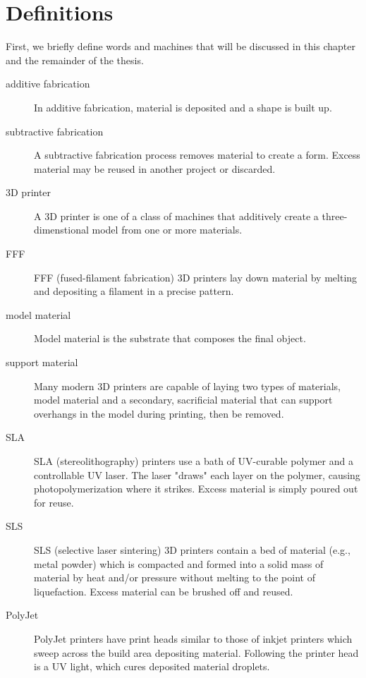 \section{Definitions}

First, we briefly define words and machines that will be discussed in this chapter and the remainder of the thesis.

\begin{description}

\item[additive fabrication] In additive fabrication, material is deposited and a shape is built up.

\item[subtractive fabrication] A subtractive fabrication process removes material to create a form. Excess material may be reused in another project or discarded.

\item[3D printer] A 3D printer is one of a class of machines that additively create a three-dimenstional model from one or more materials.

\item[FFF] FFF (fused-filament fabrication) 3D printers lay down material by melting and depositing a filament in a precise pattern.

\item[model material] Model material is the substrate that composes the final object.

\item[support material] Many modern 3D printers are capable of laying two types of materials, model material and a secondary, sacrificial material that can support overhangs in the model during printing, then be removed.

\item[SLA] SLA (stereolithography) printers use a bath of UV-curable polymer and a controllable UV laser. The laser "draws" each layer on the polymer, causing photopolymerization where it strikes. Excess material is simply poured out for reuse.

\item[SLS] SLS (selective laser sintering) 3D printers contain a bed of material (e.g., metal powder) which is compacted and formed into a solid mass of material by heat and/or pressure without melting to the point of liquefaction. Excess material can be brushed off and reused.

\item[PolyJet] PolyJet printers have print heads similar to those of inkjet printers which sweep across the build area depositing material. Following the printer head is a UV light, which cures deposited material droplets.


\end{description}
